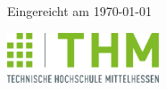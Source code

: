 \begin{titlepage}
\begin{center}
        \vspace{15mm}

        Eingereicht am \today
    \end{center}
    \hfill %
    \includegraphics[height=1.5cm]{figures/thm-thm.pdf} %
\end{titlepage}

